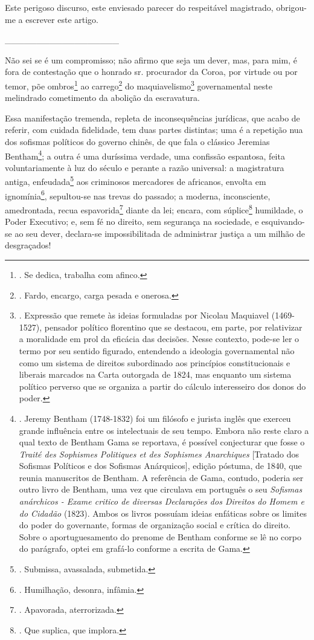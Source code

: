 Este perigoso discurso, este enviesado parecer do respeitável
magistrado, obrigou-me a escrever este artigo.

\_\_\_\_\_\_\_\_\_\_\_\_\_\_\_\_\_\_

Não sei se é um compromisso; não afirmo que seja um dever, mas, para
mim, é fora de contestação que o honrado sr. procurador da Coroa, por
virtude ou por temor, põe ombros\footnote{. Se dedica, trabalha com
  afinco.} ao carrego\footnote{. Fardo, encargo, carga pesada e onerosa.}
do maquiavelismo\footnote{. Expressão que remete às ideias formuladas
  por Nicolau Maquiavel (1469-1527), pensador político florentino que se
  destacou, em parte, por relativizar a moralidade em prol da eficácia
  das decisões. Nesse contexto, pode-se ler o termo por seu sentido
  figurado, entendendo a ideologia governamental não como um sistema de
  direitos subordinado aos princípios constitucionais e liberais
  marcados na Carta outorgada de 1824, mas enquanto um sistema político
  perverso que se organiza a partir do cálculo interesseiro dos donos do
  poder.} governamental neste melindrado cometimento da abolição da
escravatura.

Essa manifestação tremenda, repleta de inconsequências jurídicas, que
acabo de referir, com cuidada fidelidade, tem duas partes distintas; uma
é a repetição nua dos sofismas políticos do governo chinês, de que fala
o clássico Jeremias Bentham\footnote{. Jeremy Bentham (1748-1832) foi um
  filósofo e jurista inglês que exerceu grande influência entre os
  intelectuais de seu tempo. Embora não reste claro a qual texto de
  Bentham Gama se reportava, é possível conjecturar que fosse o
  \emph{Traité des Sophismes Politiques et des Sophismes Anarchiques}
  {[}Tratado dos Sofismas Políticos e dos Sofismas Anárquicos{]}, edição
  póstuma, de 1840, que reunia manuscritos de Bentham. A referência de
  Gama, contudo, poderia ser outro livro de Bentham, uma vez que
  circulava em português o seu \emph{Sofismas anárchicos - Exame critico
  de diversas Declarações dos Direitos do Homem e do Cidadão} (1823).
  Ambos os livros possuíam ideias enfáticas sobre os limites do poder do
  governante, formas de organização social e crítica do direito. Sobre o
  aportuguesamento do prenome de Bentham conforme se lê no corpo do
  parágrafo, optei em grafá-lo conforme a escrita de Gama.}; a outra é
uma duríssima verdade, uma confissão espantosa, feita voluntariamente à
luz do século e perante a razão universal: a magistratura antiga,
enfeudada\footnote{. Submissa, avassalada, submetida.} aos criminosos
mercadores de africanos, envolta em ignomínia\footnote{. Humilhação,
  desonra, infâmia.}, sepultou-se nas trevas do passado; a moderna,
inconsciente, amedrontada, recua espavorida\footnote{. Apavorada,
  aterrorizada.} diante da lei; encara, com súplice\footnote{. Que
  suplica, que implora.} humildade, o Poder Executivo; e, sem fé no
direito, sem segurança na sociedade, e esquivando-se ao seu dever,
declara-se impossibilitada de administrar justiça a um milhão de
desgraçados!

